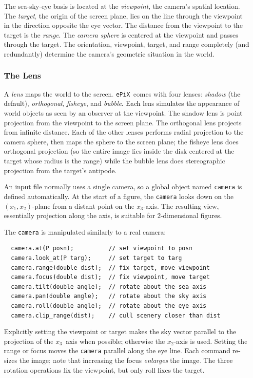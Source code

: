 \documentclass[12pt,letterpaper]{book}
\newcommand{\code}[1]{\texttt{#1}}
\newcommand{\ePiX}{\code{ePiX}}
\newcommand{\teximath}[1]{$#1$}
\newcommand{\findex}[1]{\ignorespaces}
\begin{document}
The sea-sky-eye basis is located at the \emph{viewpoint}, the camera's
spatial location. The \emph{target}, the origin of the screen plane,
lies on the line through the viewpoint in the direction opposite the
eye vector.  The distance from the viewpoint to the target is the
\emph{range}.  The \emph{camera sphere} is centered at the viewpoint
and passes through the target.  The orientation, viewpoint, target,
and range completely (and redundantly) determine the camera's
geometric situation in the world.


\subsubsection*{The Lens}

A \emph{lens} maps the world to the screen.  \ePiX\ comes with four
lenses: \emph{shadow} (the default), \emph{orthogonal},
\emph{fisheye}, and \emph{bubble}. Each lens simulates the appearance
of world objects as seen by an observer at the viewpoint. The shadow
lens is point projection from the viewpoint to the screen plane. The
orthogonal lens projects from infinite distance.  Each of the other
lenses performs radial projection to the camera sphere, then maps the
sphere to the screen plane; the fisheye lens does orthogonal
projection (so the entire image lies inside the disk centered at the
target whose radius is the range) while the bubble lens does
stereographic projection from the target's antipode.


An input file normally uses a single camera, so a global object named
\code{camera} is defined automatically. At the start of a figure, the
\code{camera} looks down on the \teximath{(x_1,x_2)}-plane from a
distant point on the \teximath{x_3}-axis. The resulting view,
essentially projection along the axis, is suitable for 2-dimensional
figures.

The \code{camera} is manipulated similarly to a real camera:
\findex{Camera.at}
\findex{Camera.look\_at}
\findex{Camera.range}
\findex{Camera.focus}
\findex{Camera.tilt}
\findex{Camera.pan}
\findex{Camera.roll}
\findex{Camera.clip\_range}
\begin{verbatim}
  camera.at(P posn);          // set viewpoint to posn
  camera.look_at(P targ);     // set target to targ
  camera.range(double dist);  // fix target, move viewpoint
  camera.focus(double dist);  // fix viewpoint, move target
  camera.tilt(double angle);  // rotate about the sea axis
  camera.pan(double angle);   // rotate about the sky axis
  camera.roll(double angle);  // rotate about the eye axis
  camera.clip_range(dist);    // cull scenery closer than dist
\end{verbatim}
Explicitly setting the viewpoint or target makes the sky vector
parallel to the projection of the \teximath{x_3}~axis when possible;
otherwise the \teximath{x_2}-axis is used. Setting the range or focus
moves the \code{camera} parallel along the eye line. Each command
re-sizes the image; note that increasing the focus \emph{enlarges} the
image. The three rotation operations fix the viewpoint, but only roll
fixes the target.
\end{document}
